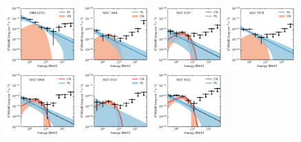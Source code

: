 \documentclass[doublespace,draft,nopageskip]{VTthesis} %
\begin{document}
\begin{appendices}
\begin{figure}
\centering
\includegraphics[width=0.24\textwidth]{Figures/Globular/spectra/2comp_0.pdf}
\includegraphics[width=0.24\textwidth]{Figures/Globular/spectra/2comp_4.pdf}
\includegraphics[width=0.24\textwidth]{Figures/Globular/spectra/2comp_16.pdf}
\includegraphics[width=0.24\textwidth]{Figures/Globular/spectra/2comp_26.pdf}
\includegraphics[width=0.24\textwidth]{Figures/Globular/spectra/2comp_7.pdf}
\includegraphics[width=0.24\textwidth]{Figures/Globular/spectra/2comp_14.pdf}
\includegraphics[width=0.24\textwidth]{Figures/Globular/spectra/2comp_21.pdf}

\end{figure}
\end{appendices}
\end{document}

